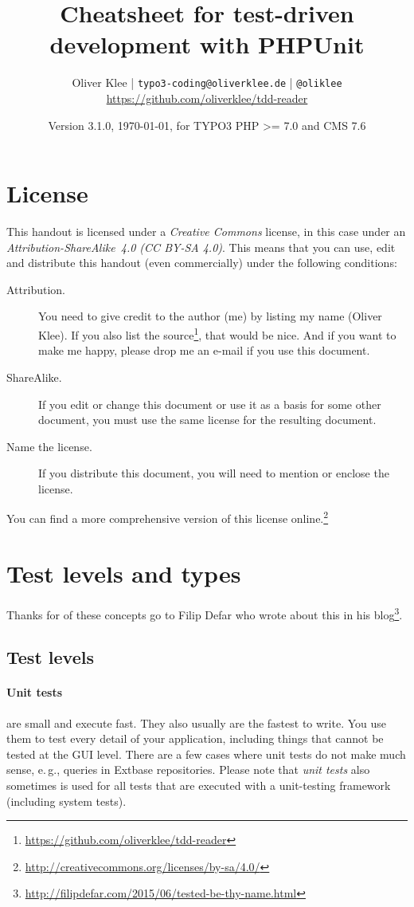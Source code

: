 \documentclass[a4paper,11pt,headsepline]{scrartcl}
\author{
  Oliver Klee | \texttt{typo3-coding@oliverklee.de} | \texttt{@oliklee} \\
  \url{https://github.com/oliverklee/tdd-reader}
}
\date{Version 3.1.0, \today, for TYPO3 PHP >= 7.0 and CMS 7.6}
\title{
  Cheatsheet for test-driven development with PHPUnit
}
\begin{document}
\nocite*{}

\maketitle

\section*{License}

This handout is licensed under a \emph{Creative Commons} license, in this case under an \emph{Attribution-ShareAlike~4.0 (CC BY-SA 4.0)}. This means that you can use, edit and distribute this handout (even commercially) under the following conditions:

\begin{description}
  \item[Attribution.] You need to give credit to the author (me) by listing my name (Oliver Klee). If you also list the source\footnote{\url{https://github.com/oliverklee/tdd-reader}}, that would be nice. And if you want to make me happy, please drop me an e-mail if you use this document.
  \item[ShareAlike.] If you edit or change this document or use it as a basis for some other document, you must use the same license for the resulting document.
  \item[Name the license.] If you distribute this document, you will need to mention or enclose the license.
\end{description}

You can find a more comprehensive version of this license online.\footnote{\url{http://creativecommons.org/licenses/by-sa/4.0/}}


\pagebreak
\tableofcontents

\pagebreak
\section{Test levels and types}

Thanks for of these concepts go to Filip Defar who wrote about this in his blog\footnote{\url{http://filipdefar.com/2015/06/tested-be-thy-name.html}}.


\subsection{Test levels}

\paragraph{Unit tests} are small and execute fast. They also usually are the fastest to write. You use them to test every detail of your application, including things that cannot be tested at the GUI level. There are a few cases where unit tests do not make much sense, e.\,g., queries in Extbase repositories. Please note that \emph{unit tests} also sometimes is used for all tests that are executed with a unit-testing framework (including system tests).
\end{document}
